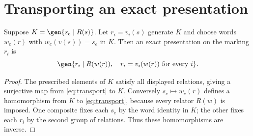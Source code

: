 \section{Transporting an exact presentation}
\begin{lemma}\label{lem:transport}
Suppose $K=\gen{s_e\mid R(s)}$. Let $r_i=v_i(s)$ generate $K$ and
choose words $w_e(r)$ with $w_e(v(s))=s_e$ in $K$. Then an exact
presentation on the marking $r_i$ is
\begin{equation}\label{eq:transport}
 \gen{r_i\mid R(w(r)),\quad r_i=v_i(w(r))\text{ for every }i}.
                                                               \end{equation}
\end{lemma}
\begin{proof}
The prescribed elements of $K$ satisfy all displayed relations, giving
a surjective map from \eqref{eq:transport} to $K$. Conversely $s_e\mapsto w_e(r)$
defines a homomorphism from $K$ to \eqref{eq:transport}, because every relator $R(w)$
is imposed. One composite fixes each $s_e$ by the word identity in
$K$; the other fixes each $r_i$ by the second group of relations.
Thus these homomorphisms are inverse.
\end{proof}

